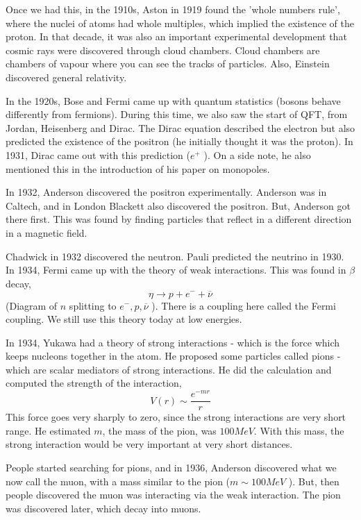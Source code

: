 \documentclass[11pt, oneside]{article}   	%
\theoremstyle{slanted}
\begin{document}
Once we had this, in the 1910s, Aston in 1919 
found the 'whole numbers rule',
where the nuclei of atoms had whole multiples, which implied the existence of the proton. 
In that decade, it was also an important 
experimental development 
that cosmic rays were discovered through cloud chambers. 
Cloud chambers are chambers of vapour where 
you can see the tracks of particles. 
Also, Einstein discovered general relativity. 

In the 1920s, Bose and Fermi 
came up with quantum statistics (bosons behave differently from fermions). 
During this time, we also saw 
the start of QFT, from Jordan, Heisenberg and Dirac. 
The Dirac equation described the electron but also predicted
the existence of the positron (he initially thought it 
was the proton). 
In 1931, Dirac came out with this prediction ($ e ^ + $  ). 
On a side note, he also mentioned this in the introduction 
of his paper on monopoles. 

In 1932, Anderson discovered the positron 
experimentally. 
Anderson was in Caltech, and in London Blackett also 
discovered the positron. But, Anderson got there first. 
This was found by finding particles that reflect in a 
different direction in a magnetic field. 

Chadwick in 1932 discovered the neutron. 
Pauli predicted the neutrino in 1930.  
In 1934, Fermi came up with the theory 
of weak interactions. 
This was found in $ \beta $ decay, 
\[
\eta \to p  + e ^ - + \overline{ \nu } 
\] (Diagram of $ n $ splitting to $ e ^  - , p , \overline{ \nu }  $ ). 
There is a coupling here 
called the Fermi coupling. 
We still use this theory today at low energies. 

In 1934, Yukawa had a theory of strong interactions - which 
is the force which keeps nucleons together 
in the atom. 
He proposed some particles called pions -
which are scalar mediators 
of strong interactions. 
He did the calculation and computed 
the strength of the interaction, 
\[
V \left( r  \right)   \sim  \frac{ e ^{   - m r } }{ r } 
\] This force goes very sharply to zero, 
since the strong interactions are very short range. 
He estimated $ m $, the mass of the pion, was 
$ 100 Me V $. 
With this mass, the strong interaction 
would be very important at very short distances. 


People started searching for pions, and in 
1936, Anderson discovered what we now call the muon, 
with a mass similar to the pion ($ m \sim 100 M eV $  ). 
But, then people discovered the muon was interacting 
via the weak interaction. 
The pion was discovered later, 
which decay into muons. 
\end{document}
